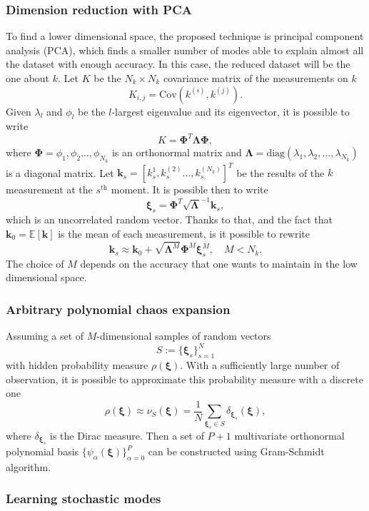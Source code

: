 \documentclass[11pt,a4paper]{article}
\begin{document}
\subsubsection{Dimension reduction with PCA}
To find a lower dimensional space, the proposed technique is principal component analysis (PCA), which finds a smaller number of modes able to explain almost all the dataset with enough accuracy. In this case, the reduced dataset will be the one about \(k\).
Let \(K\) be the \(N_k\times N_k\) covariance matrix of the measurements on \(k\)
\[
   K_{i,j} = \text{Cov}(k^{(i)}, k^{(j)}).
\]
Given \(\lambda_l\) and \(\phi_l\) be the \(l\)-largest eigenvalue and its eigenvector, it is possible to write 
\[
    K = \bm{\Phi}^T\bm{\Lambda}\bm{\Phi},
\]
where \(\bm{\Phi} = \phi_1, \phi_2 \ldots, \phi_{N_k}\) is an orthonormal matrix and \(\bm{\Lambda} = \text{diag}(\lambda_1, \lambda_2, \ldots, \lambda_{N_k})\) is a diagonal matrix. Let \(\bm{k}_s = [k^{1}_s, k^{(2)}_s \ldots, k^{(N_k)}_s]^T\) be the results of the \(k\) measurement at the \(s^{\text{th}}\) moment. It is possible then to write
\[
    \bm{\xi}_s = \bm{\Phi}^T \sqrt{\bm{\Lambda}}^{-1} \bm{k}_s,
\]
which is an uncorrelated random vector. Thanks to that, and the fact that \(\bm{k}_0 = \mathbb{E}[\bm{k}]\) is the mean of each measurement, is it possible to rewrite 
\[
    \bm{k}_s \approx \bm{k}_0 + \sqrt{\bm{\Lambda}^M}\bm{\Phi}^M\bm{\xi}^M_s, \quad M < N_k.
\]
The choice of \(M\) depends on the accuracy that one wants to maintain in the low dimensional space.
\subsubsection{Arbitrary polynomial chaos expansion}
Assuming a set of \(M\)-dimensional samples of random vectors 
\[
    S:= \{\bm{\xi}_s\}_{s=1}^N
\]
with hidden probability measure \(\rho(\bm{\xi})\). With a sufficiently large number of observation, it is possible to approximate this probability measure with a discrete one
\[
    \rho(\bm{\xi}) \approx \nu_S(\bm{\xi}) = \frac{1}{N} \sum_{\bm{\xi}_s \in S} \delta_{\bm{\xi}_s}(\bm{\xi}), 
\]
where \(\delta_{\bm{\xi}_s}\) is the Dirac measure. Then a set of \(P+1\) multivariate orthonormal polynomial basis \(\{\psi_\alpha(\bm{\xi})\}^P_{\alpha=0}\) can be constructed using Gram-Schmidt algorithm. 

\subsubsection{Learning stochastic modes}
\end{document}
